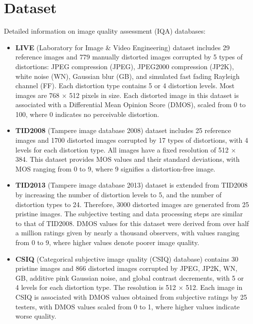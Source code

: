 \chapter{Dataset}
\label{ch:Dataset}
Detailed information on image quality assessment (IQA) databases: \par
\begin{itemize}
    \item \textbf{LIVE} (Laboratory for Image \& Video Engineering) dataset \autocite{LIVE} includes 29 reference images and 779 manually distorted images corrupted by 5 types of distortions: JPEG compression (JPEG), JPEG2000 compression (JP2K), white noise (WN), Gaussian blur (GB), and simulated fast fading Rayleigh channel (FF). Each distortion type contains 5 or 4 distortion levels. Most images are 768 $\times$ 512 pixels in size. Each distorted image in this dataset is associated with a Differential Mean Opinion Score (DMOS), scaled from 0 to 100, where 0 indicates no perceivable distortion. 
    \item \textbf{TID2008} (Tampere image database 2008) dataset \autocite{TID2008} includes 25 reference images and 1700 distorted images corrupted by 17 types of distortions, with 4 levels for each distortion type. All images have a fixed resolution of 512 $\times$ 384. This dataset provides MOS values and their standard deviations, with MOS ranging from 0 to 9, where 9 signifies a distortion-free image.
    \item \textbf{TID2013} (Tampere image database 2013) dataset \autocite{TID2013} is extended from TID2008 \autocite{TID2008} by increasing the number of distortion levels to 5, and the number of distortion types to 24. Therefore, 3000 distorted images are generated from 25 pristine images. The subjective testing and data processing steps are similar to that of TID2008. DMOS values for this dataset were derived from over half a million ratings given by nearly a thousand observers, with values ranging from 0 to 9, where higher values denote poorer image quality.
    \item \textbf{CSIQ} (Categorical subjective image quality (CSIQ) database) \autocite{CSIQ} contains 30 pristine images and 866 distorted images corrupted by JPEG, JP2K, WN, GB, additive pink Gaussian noise, and global contrast decrements, with 5 or 4 levels for each distortion type. The resolution is 512 $\times$ 512. Each image in CSIQ is associated with DMOS values obtained from subjective ratings by 25 testers, with DMOS values scaled from 0 to 1, where higher values indicate worse quality.

\end{itemize}
